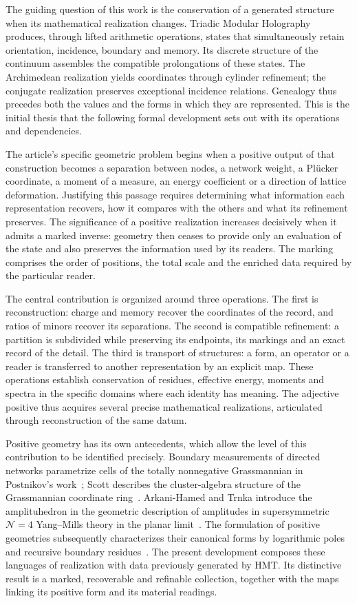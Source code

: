 The guiding question of this work is the conservation of a generated
structure when its mathematical realization changes. Triadic Modular
Holography produces, through lifted arithmetic operations, states that
simultaneously retain orientation, incidence, boundary and memory. Its
discrete structure of the continuum assembles the compatible prolongations of
these states. The Archimedean realization yields coordinates through
cylinder refinement; the conjugate realization preserves exceptional
incidence relations. Genealogy thus precedes both the values
and the forms in which they are represented. This is the initial thesis that
the following formal development sets out with its operations and dependencies.

The article's specific geometric problem begins when a positive output
of that construction becomes a separation between nodes,
a network weight, a Plücker coordinate, a moment of a measure, an energy
coefficient or a direction of lattice deformation. Justifying this passage
requires determining what information each representation recovers, how
it compares with the others and what its refinement preserves. The significance
of a positive realization increases decisively when it admits a
marked inverse: geometry then ceases to provide only an evaluation
of the state and also preserves the information used by its readers.
The marking comprises the order of positions, the total scale and the
enriched data required by the particular reader.

The central contribution is organized around three operations. The first
is reconstruction: charge and memory recover the coordinates
of the record, and ratios of minors recover its separations.
The second is compatible refinement: a partition is subdivided
while preserving its endpoints, its markings and an exact record of the detail.
The third is transport of structures: a form, an operator or a
reader is transferred to another representation by an explicit map. These
operations establish conservation of residues, effective energy,
moments and spectra in the specific domains where each identity has
meaning. The adjective positive thus acquires several precise
mathematical realizations, articulated through reconstruction of the same datum.

Positive geometry has its own antecedents, which allow the level
of this contribution to be identified precisely. Boundary measurements
of directed networks parametrize cells of the totally nonnegative
Grassmannian in Postnikov's work~\cite{postnikov}; Scott describes the
cluster-algebra structure of the Grassmannian coordinate
ring~\cite{scott}. Arkani-Hamed and Trnka introduce the amplituhedron
in the geometric description of amplitudes in supersymmetric
\(\mathcal N=4\) Yang--Mills theory in the planar limit~\cite{amplituhedron}.
The formulation of positive geometries subsequently characterizes their canonical
forms by logarithmic poles and recursive boundary
residues~\cite{positive}. The present development composes these languages
of realization with data previously generated by HMT. Its distinctive
result is a marked, recoverable and refinable collection, together with
the maps linking its positive form and its material readings.


